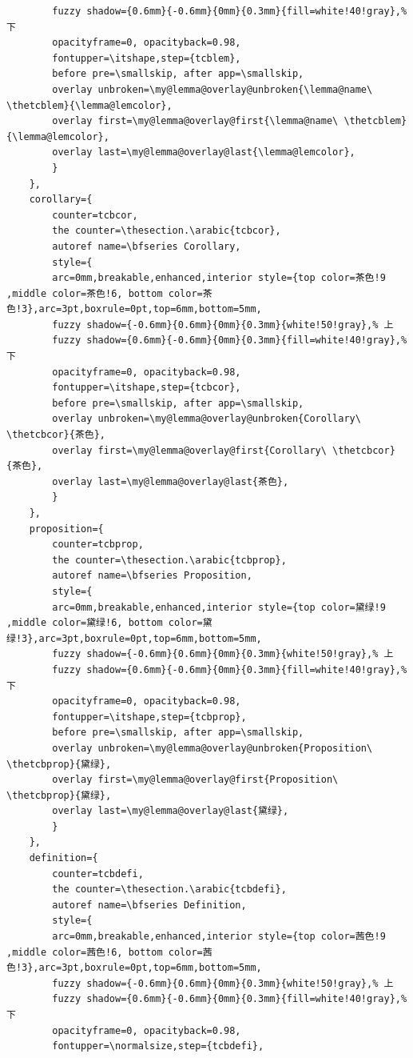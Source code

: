 \documentclass[lang=cn,zihao=-4,a4paper,fontset=windows]{beautybook}
\begin{document}
\begin{lstlisting}
        fuzzy shadow={0.6mm}{-0.6mm}{0mm}{0.3mm}{fill=white!40!gray},%下
        opacityframe=0, opacityback=0.98,
        fontupper=\itshape,step={tcblem},
        before pre=\smallskip, after app=\smallskip,
        overlay unbroken=\my@lemma@overlay@unbroken{\lemma@name\ \thetcblem}{\lemma@lemcolor},
        overlay first=\my@lemma@overlay@first{\lemma@name\ \thetcblem}{\lemma@lemcolor},
        overlay last=\my@lemma@overlay@last{\lemma@lemcolor},
        }
    },
    corollary={
        counter=tcbcor,
        the counter=\thesection.\arabic{tcbcor},
        autoref name=\bfseries Corollary,
        style={
        arc=0mm,breakable,enhanced,interior style={top color=茶色!9 ,middle color=茶色!6, bottom color=茶色!3},arc=3pt,boxrule=0pt,top=6mm,bottom=5mm,
        fuzzy shadow={-0.6mm}{0.6mm}{0mm}{0.3mm}{white!50!gray},% 上
        fuzzy shadow={0.6mm}{-0.6mm}{0mm}{0.3mm}{fill=white!40!gray},%下
        opacityframe=0, opacityback=0.98,
        fontupper=\itshape,step={tcbcor},
        before pre=\smallskip, after app=\smallskip,
        overlay unbroken=\my@lemma@overlay@unbroken{Corollary\ \thetcbcor}{茶色},
        overlay first=\my@lemma@overlay@first{Corollary\ \thetcbcor}{茶色},
        overlay last=\my@lemma@overlay@last{茶色},
        }
    },
    proposition={
        counter=tcbprop,
        the counter=\thesection.\arabic{tcbprop},
        autoref name=\bfseries Proposition,
        style={
        arc=0mm,breakable,enhanced,interior style={top color=黛绿!9 ,middle color=黛绿!6, bottom color=黛绿!3},arc=3pt,boxrule=0pt,top=6mm,bottom=5mm,
        fuzzy shadow={-0.6mm}{0.6mm}{0mm}{0.3mm}{white!50!gray},% 上
        fuzzy shadow={0.6mm}{-0.6mm}{0mm}{0.3mm}{fill=white!40!gray},%下
        opacityframe=0, opacityback=0.98,
        fontupper=\itshape,step={tcbprop},
        before pre=\smallskip, after app=\smallskip,
        overlay unbroken=\my@lemma@overlay@unbroken{Proposition\ \thetcbprop}{黛绿},
        overlay first=\my@lemma@overlay@first{Proposition\ \thetcbprop}{黛绿},
        overlay last=\my@lemma@overlay@last{黛绿},
        }
    },
    definition={
        counter=tcbdefi,
        the counter=\thesection.\arabic{tcbdefi},
        autoref name=\bfseries Definition,
        style={
        arc=0mm,breakable,enhanced,interior style={top color=茜色!9 ,middle color=茜色!6, bottom color=茜色!3},arc=3pt,boxrule=0pt,top=6mm,bottom=5mm,
        fuzzy shadow={-0.6mm}{0.6mm}{0mm}{0.3mm}{white!50!gray},% 上
        fuzzy shadow={0.6mm}{-0.6mm}{0mm}{0.3mm}{fill=white!40!gray},%下
        opacityframe=0, opacityback=0.98,
        fontupper=\normalsize,step={tcbdefi},

\end{lstlisting}
\end{document}

